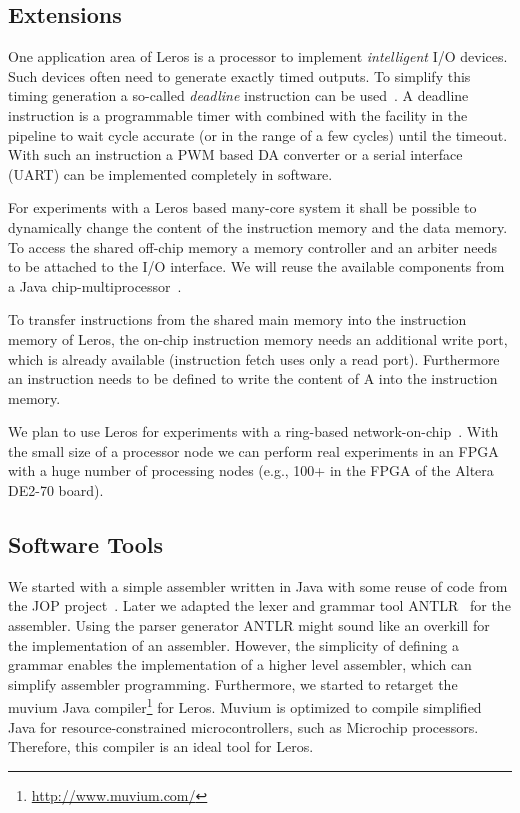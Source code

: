 \documentclass[a4paper,fontsize=10pt,twoside,DIV15,BCOR12mm,headinclude=true,footinclude=false,pagesize,bibtotoc]{scrbook}
\begin{document}
\subsection{Extensions}

One application area of Leros is a processor to implement \emph{intelligent} I/O devices. Such devices often need to generate exactly timed outputs. To simplify this timing generation a so-called \emph{deadline} instruction can be used~\cite{Edwards:06:deadline, jop:deadline}. A deadline instruction is a programmable timer with combined with the facility in the pipeline to wait cycle accurate (or in the range of a few cycles) until the timeout. With such an instruction a PWM based DA converter or a serial interface (UART) can be implemented completely in software.

For experiments with a Leros based many-core system it shall be possible to dynamically change the content of the instruction memory and the data memory. To access the shared off-chip memory a memory controller and an arbiter needs to be attached to the I/O interface. We will reuse the available components from a Java chip-multiprocessor~\cite{jop:tecs:cmp}.

To transfer instructions from the shared main memory into the instruction memory of Leros, the on-chip instruction memory needs an additional write port, which is already available (instruction fetch uses only a read port). Furthermore an instruction needs to be defined to write the content of A into the instruction memory.

We plan to use Leros for experiments with a ring-based network-on-chip~\cite{jop:csp}. With the small size of a processor node we can perform real experiments in an FPGA with a huge number of processing nodes (e.g., 100+ in the FPGA of the Altera DE2-70 board).

\subsection{Software Tools}

We started with a simple assembler written in Java with some reuse of code from the JOP project~\cite{jop:jnl:jsa2007}. Later we adapted the lexer and grammar tool ANTLR~\cite{antlr:1995} for the assembler. Using the parser generator ANTLR might sound like an overkill for the implementation of an assembler. However, the simplicity of defining a grammar enables the implementation of a  higher level assembler, which can simplify assembler programming. Furthermore, we started to retarget the muvium Java compiler\footnote{\url{http://www.muvium.com/}} for Leros. Muvium is optimized to compile simplified Java for resource-constrained microcontrollers, such as Microchip processors. Therefore, this compiler is an ideal tool for Leros.
\end{document}
